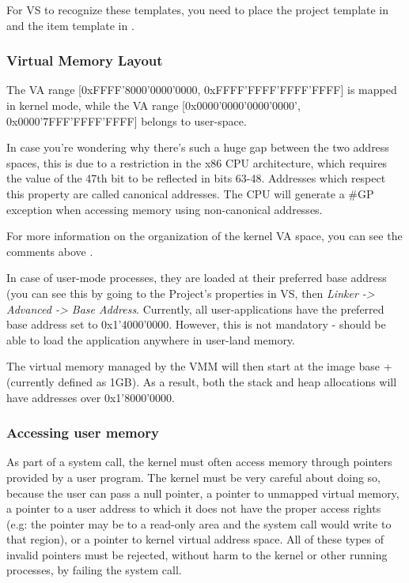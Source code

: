 For VS to recognize these templates, you need to place the project template in  and the item template in .

\subsubsection{Virtual Memory Layout}
\label{sect:VirtMemLayout}

The VA range [0xFFFF'8000'0000'0000, 0xFFFF'FFFF'FFFF'FFFF] is mapped in kernel mode, while the
VA range [0x0000'0000'0000'0000', 0x0000'7FFF'FFFF'FFFF] belongs to user-space.

In case you're wondering why there's such a huge gap between the two address spaces, this is due to a
restriction in the x86 CPU architecture, which requires the value of the 47th bit to be reflected in
bits 63-48. Addresses which respect this property are called canonical addresses. The CPU will
generate a \#GP exception when accessing memory using non-canonical addresses.

For more information on the organization of the kernel VA space, you can see the comments above
.

In case of user-mode processes, they are loaded at their preferred base address (you can see this by
going to the Project's properties in VS, then \textit{Linker -> Advanced -> Base Address}. Currently,
all \projectname user-applications have the preferred base address set to 0x1'4000'0000. However, this
is not mandatory - \projectname should be able to load the application anywhere in user-land memory.

The virtual memory managed by the VMM will then start at the image base +
(currently defined as 1GB). As a result, both the stack and heap allocations will have addresses over
0x1'8000'0000.

\subsubsection{Accessing user memory}

As part of a system call, the kernel must often access memory through pointers provided by a user
program. The kernel must be very careful about doing so, because the user can pass a null pointer,
a pointer to unmapped virtual memory, a pointer to a user address to which it does not have the
proper access rights (e.g: the pointer may be to a read-only area and the system call would write to
that region), or a pointer to kernel virtual address space. All of these types of invalid pointers
must be rejected, without harm to the kernel or other running processes, by failing the system call.

